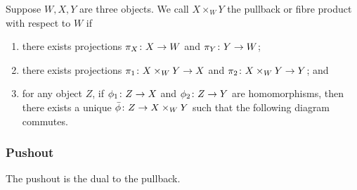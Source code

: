 \begin{definition}
    Suppose \(W,X,Y\) are three objects.
    We call \(X \times_W Y\) the pullback or fibre product with respect to \(W\) if
    \begin{enumerate}[label={(\roman*)}, itemsep=0mm]
        \item there exists projections \(\pi_X\colon X\to W\) and \(\pi_Y\colon Y\to W\);
        \item there exists projections \(\pi_1\colon X \times_W Y\to X\)
            and \(\pi_2\colon X \times_W Y\to Y\); and
        \item for any object \(Z\),
            if \(\phi_1\colon Z\to X\) and \(\phi_2\colon Z\to Y\) are homomorphisms,
            then there exists a unique \(\bar{\phi}\colon Z\to X \times_W Y\)
            such that the following diagram commutes.
    \end{enumerate}
    \begin{center}
    \end{center}
\end{definition}

\subsubsection*{Pushout}

\begin{remark}
    The pushout is the dual to the pullback.
\end{remark}


